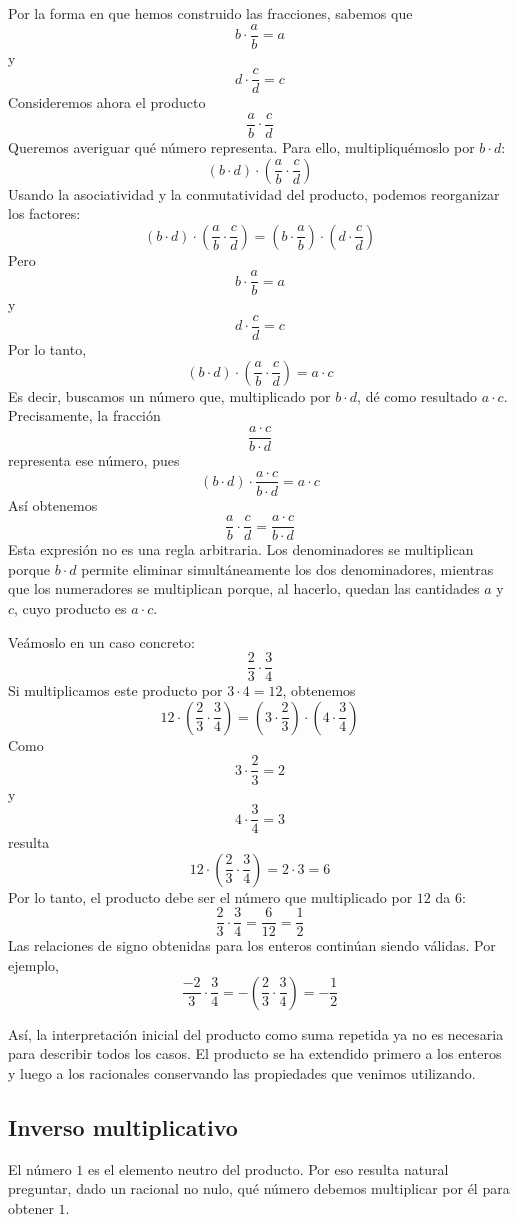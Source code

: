 Por la forma en que hemos construido las fracciones, sabemos que
\[
b\cdot\frac{a}{b}=a
\]
y
\[
d\cdot\frac{c}{d}=c
\]
Consideremos ahora el producto
\[
\frac{a}{b}\cdot\frac{c}{d}
\]
Queremos averiguar qué número representa. Para ello, multipliquémoslo por \(b\cdot d\):
\[
(b\cdot d)\cdot
\left(
\frac{a}{b}\cdot\frac{c}{d}
\right)
\]
Usando la asociatividad y la conmutatividad del producto, podemos reorganizar los factores:
\[
(b\cdot d)\cdot
\left(
\frac{a}{b}\cdot\frac{c}{d}
\right)
=
\left(
b\cdot\frac{a}{b}
\right)
\cdot
\left(
d\cdot\frac{c}{d}
\right)
\]
Pero
\[
b\cdot\frac{a}{b}=a
\]
y
\[
d\cdot\frac{c}{d}=c
\]
Por lo tanto,
\[
(b\cdot d)\cdot
\left(
\frac{a}{b}\cdot\frac{c}{d}
\right)
=
a\cdot c
\]
Es decir, buscamos un número que, multiplicado por \(b\cdot d\), dé como resultado \(a\cdot c\). Precisamente, la fracción
\[
\frac{a\cdot c}{b\cdot d}
\]
representa ese número, pues
\[
(b\cdot d)\cdot
\frac{a\cdot c}{b\cdot d}
=
a\cdot c
\]
Así obtenemos
\[
\boxed{
\frac{a}{b}\cdot\frac{c}{d}
=
\frac{a\cdot c}{b\cdot d}
}
\]
Esta expresión no es una regla arbitraria. Los denominadores se multiplican porque \(b\cdot d\) permite eliminar simultáneamente los dos denominadores, mientras que los numeradores se multiplican porque, al hacerlo, quedan las cantidades \(a\) y \(c\), cuyo producto es \(a\cdot c\).

Veámoslo en un caso concreto:
\[
\frac23\cdot\frac34
\]
Si multiplicamos este producto por \(3\cdot4=12\), obtenemos
\[
12\cdot
\left(
\frac23\cdot\frac34
\right)
=
\left(
3\cdot\frac23
\right)
\cdot
\left(
4\cdot\frac34
\right)
\]
Como
\[
3\cdot\frac23=2
\]
y
\[
4\cdot\frac34=3
\]
resulta
\[
12\cdot
\left(
\frac23\cdot\frac34
\right)
=
2\cdot3
=
6
\]
Por lo tanto, el producto debe ser el número que multiplicado por \(12\) da \(6\):
\[
\frac23\cdot\frac34
=
\frac6{12}
=
\frac12
\]
Las relaciones de signo obtenidas para los enteros continúan siendo válidas. Por ejemplo,
\[
\frac{-2}{3}\cdot\frac34
=
-\left(
\frac23\cdot\frac34
\right)
=
-\frac12
\]

Así, la interpretación inicial del producto como suma repetida ya no es necesaria para describir todos los casos. El producto se ha extendido primero a los enteros y luego a los racionales conservando las propiedades que venimos utilizando.

\subsection{Inverso multiplicativo}

El número \(1\) es el elemento neutro del producto. Por eso resulta natural preguntar, dado un racional no nulo, qué número debemos multiplicar por él para obtener \(1\).

